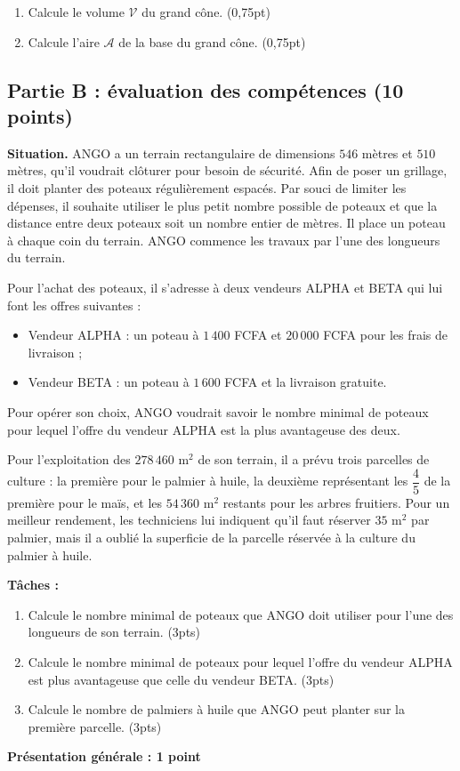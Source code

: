 \begin{enumerate}[label=\arabic*)]
\item Calcule le volume $\mathcal{V}$ du grand cône. \hfill (0,75pt)
\item Calcule l'aire $\mathcal{A}$ de la base du grand cône. \hfill (0,75pt)
\end{enumerate}

\subsection*{Partie B : évaluation des compétences (10 points)}

\textbf{Situation.} ANGO a un terrain rectangulaire de dimensions $546$ mètres et $510$
mètres, qu'il voudrait clôturer pour besoin de sécurité. Afin de poser un grillage, il doit
planter des poteaux régulièrement espacés. Par souci de limiter les dépenses, il souhaite
utiliser le plus petit nombre possible de poteaux et que la distance entre deux poteaux
soit un nombre entier de mètres. Il place un poteau à chaque coin du terrain. ANGO commence
les travaux par l'une des longueurs du terrain.

Pour l'achat des poteaux, il s'adresse à deux vendeurs ALPHA et BETA qui lui font les
offres suivantes :
\begin{itemize}
\item Vendeur ALPHA : un poteau à $1\,400$ FCFA et $20\,000$ FCFA pour les frais de
livraison ;
\item Vendeur BETA : un poteau à $1\,600$ FCFA et la livraison gratuite.
\end{itemize}
Pour opérer son choix, ANGO voudrait savoir le nombre minimal de poteaux pour lequel
l'offre du vendeur ALPHA est la plus avantageuse des deux.

Pour l'exploitation des $278\,460$ m$^{2}$ de son terrain, il a prévu trois parcelles de
culture : la première pour le palmier à huile, la deuxième représentant les $\dfrac45$ de
la première pour le maïs, et les $54\,360$ m$^{2}$ restants pour les arbres fruitiers. Pour
un meilleur rendement, les techniciens lui indiquent qu'il faut réserver $35$ m$^{2}$ par
palmier, mais il a oublié la superficie de la parcelle réservée à la culture du palmier à
huile.

\textbf{Tâches :}
\begin{enumerate}[label=\arabic*)]
\item Calcule le nombre minimal de poteaux que ANGO doit utiliser pour l'une des longueurs
de son terrain. \hfill (3pts)
\item Calcule le nombre minimal de poteaux pour lequel l'offre du vendeur ALPHA est plus
avantageuse que celle du vendeur BETA. \hfill (3pts)
\item Calcule le nombre de palmiers à huile que ANGO peut planter sur la première parcelle.
\hfill (3pts)
\end{enumerate}
\noindent\hfill\textbf{Présentation générale : 1 point}

